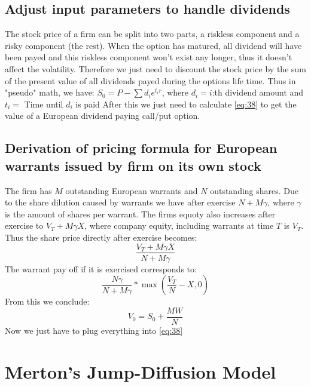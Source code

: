 \documentclass{article}
\begin{document}
\subsection{Adjust input parameters to handle dividends}
The stock price of a firm can be split into two parts, a riskless component and a risky component (the rest). When the option has matured, all dividend will have been payed and this riskless component won't exist any longer, thus it doesn't affect the volatility. Therefore we just need to discount the stock price by the sum of the present value of all dividends payed during the options life time. Thus in "pseudo" math, we have: \newline\newline
$S_0 = P - \sum d_i e^{t_i r}$, where $d_i = i$:th dividend amount and $t_i = $ Time until $d_i$ is paid\newline\newline
After this we just need to calculate \ref{eq:38} to get the value of a European dividend paying call/put option.

\subsection{Derivation of pricing formula for European warrants issued by firm on its own stock}
The firm has $M$ outstanding European warrants and $N$ outstanding shares. Due to the share dilution caused by warrants we have after exercise $N + M \gamma$, where $\gamma$ is the amount of shares per warrant. The firms equoty also increases after exercise to $V_T + M \gamma X$, where company equity, including warrants at time $T$ is $V_T$. Thus the share price directly after exercise becomes:
\begin{equation}
    \frac{V_T + M \gamma X}{N + M \gamma}
\end{equation}
The warrant pay off if it is exercised corresponds to:
\begin{equation}
    \frac{N \gamma}{N + M \gamma} * \max\left(\frac{V_T}{N} - X, 0\right)
\end{equation}
From this we conclude:
\begin{equation}
    V_0 = S_0 + \frac{M W}{N}
\end{equation}
Now we just have to plug everything into \ref{eq:38}

\section{Merton's Jump-Diffusion Model}
\end{document}

